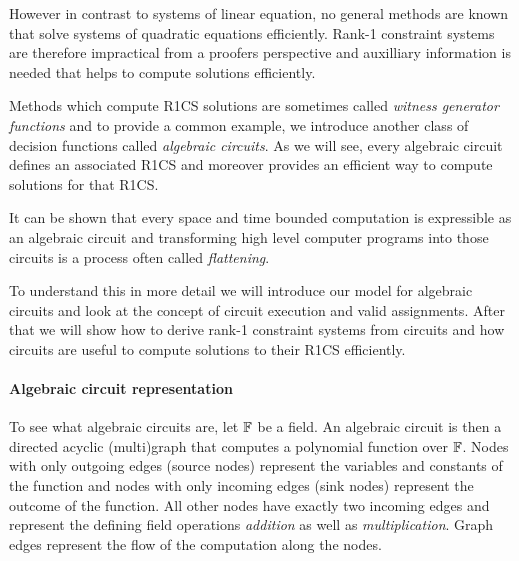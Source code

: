 However in contrast to systems of linear equation, no general methods are known that solve systems of quadratic equations efficiently. Rank-1 constraint systems are therefore impractical from a proofers perspective and auxilliary information is needed that helps to compute solutions efficiently.

Methods which compute R1CS solutions are sometimes called \textit{witness generator functions} and to provide a common example, we introduce another class of decision functions called \textit{algebraic circuits}. As we will see, every algebraic circuit defines an associated R1CS and moreover provides an efficient way to compute solutions for that R1CS.

It can be shown that every space and time bounded computation is expressible as an algebraic circuit and transforming high level computer programs into those circuits is a process often called \textit{flattening}. 

To understand this in more detail we will introduce our model for algebraic circuits and look at the concept of circuit execution and valid assignments. After that we will show how to derive rank-1 constraint systems from circuits and how circuits are useful to compute solutions to their R1CS efficiently.
\paragraph{Algebraic circuit representation} To see what algebraic circuits are, let $\mathbb{F}$ be a field. An algebraic circuit is then a directed acyclic (multi)graph that computes a polynomial function over $\mathbb{F}$. Nodes with only outgoing edges (source nodes) represent the variables and constants of the function and nodes with only incoming edges (sink nodes) represent the outcome of the function. All other nodes have exactly two incoming edges and represent the defining field operations \textit{addition} as well as \textit{multiplication}. Graph edges represent the flow of the computation along the nodes.

